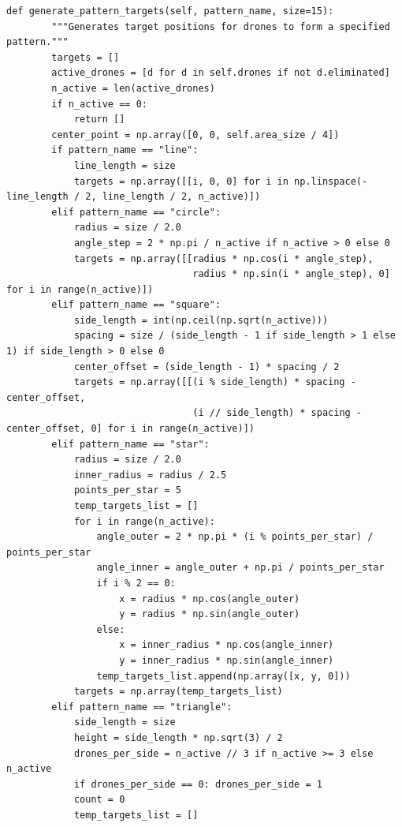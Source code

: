 \documentclass[11pt]{article}
\begin{document}
\begin{lstlisting}[style=pythonstyle]
    def generate_pattern_targets(self, pattern_name, size=15):
        """Generates target positions for drones to form a specified pattern."""
        targets = []
        active_drones = [d for d in self.drones if not d.eliminated]
        n_active = len(active_drones)
        if n_active == 0:
            return []
        center_point = np.array([0, 0, self.area_size / 4])
        if pattern_name == "line":
            line_length = size
            targets = np.array([[i, 0, 0] for i in np.linspace(-line_length / 2, line_length / 2, n_active)])
        elif pattern_name == "circle":
            radius = size / 2.0
            angle_step = 2 * np.pi / n_active if n_active > 0 else 0
            targets = np.array([[radius * np.cos(i * angle_step),
                                 radius * np.sin(i * angle_step), 0] for i in range(n_active)])
        elif pattern_name == "square":
            side_length = int(np.ceil(np.sqrt(n_active)))
            spacing = size / (side_length - 1 if side_length > 1 else 1) if side_length > 0 else 0
            center_offset = (side_length - 1) * spacing / 2
            targets = np.array([[(i % side_length) * spacing - center_offset,
                                 (i // side_length) * spacing - center_offset, 0] for i in range(n_active)])
        elif pattern_name == "star":
            radius = size / 2.0
            inner_radius = radius / 2.5
            points_per_star = 5
            temp_targets_list = []
            for i in range(n_active):
                angle_outer = 2 * np.pi * (i % points_per_star) / points_per_star
                angle_inner = angle_outer + np.pi / points_per_star
                if i % 2 == 0:
                    x = radius * np.cos(angle_outer)
                    y = radius * np.sin(angle_outer)
                else:
                    x = inner_radius * np.cos(angle_inner)
                    y = inner_radius * np.sin(angle_inner)
                temp_targets_list.append(np.array([x, y, 0]))
            targets = np.array(temp_targets_list)
        elif pattern_name == "triangle":
            side_length = size
            height = side_length * np.sqrt(3) / 2
            drones_per_side = n_active // 3 if n_active >= 3 else n_active
            if drones_per_side == 0: drones_per_side = 1
            count = 0
            temp_targets_list = []


\end{lstlisting}
\end{document}
